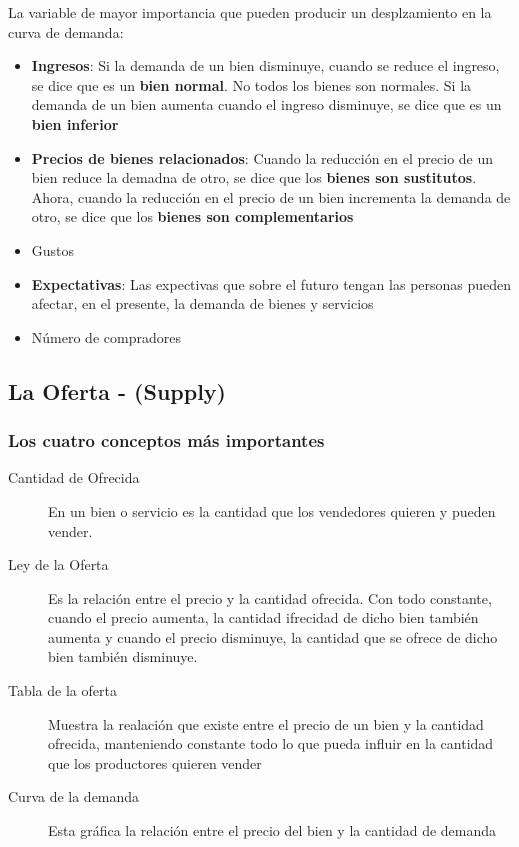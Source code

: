 \newpage

La variable de mayor importancia que pueden producir un desplzamiento en la curva de demanda:
\begin{itemize}
\item{{\bf Ingresos}: Si la demanda de un bien disminuye, cuando se reduce el ingreso, se dice que es un {\bf bien normal}. No todos los bienes son normales. Si la demanda de un bien aumenta cuando el ingreso disminuye, se dice que es un {\bf bien inferior}}
\item{{\bf Precios de bienes relacionados}: Cuando la reducción en el precio de un bien reduce la demadna de otro, se dice que los {\bf bienes son sustitutos}. Ahora, cuando la reducción en el precio de un bien incrementa la demanda de otro, se dice que los {\bf bienes son complementarios}}
\item{Gustos}
\item{{\bf Expectativas}: Las expectivas que sobre el futuro tengan las personas pueden afectar, en el presente, la demanda de bienes y servicios}
\item{Número de compradores}
\end{itemize}

\subsection{La Oferta - (Supply)}

\subsubsection{Los cuatro conceptos más importantes}
\begin{description}
\item[Cantidad de Ofrecida] En un bien o servicio es la cantidad que los vendedores quieren y pueden vender.
\item[Ley de la Oferta] Es la relación entre el precio y la cantidad ofrecida. Con todo constante, cuando el precio aumenta, la cantidad ifrecidad de dicho bien también aumenta y cuando el precio disminuye, la cantidad que se ofrece de dicho bien también disminuye.
\item[Tabla de la oferta] Muestra la realación que existe entre el precio de un bien y la cantidad ofrecida, manteniendo constante todo lo que pueda influir en la cantidad que los productores quieren vender
\item[Curva de la demanda] Esta gráfica la relación entre el precio del bien y la cantidad de demanda  
\end{description}

